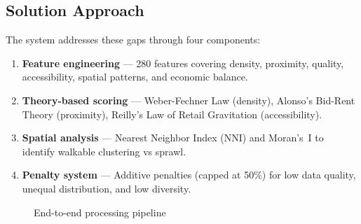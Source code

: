 \documentclass[11pt,a4paper]{article}
\begin{document}
\subsection{Solution Approach}

The system addresses these gaps through four components:

\begin{enumerate}
  \item \textbf{Feature engineering} --- 280 features covering density, proximity, quality, accessibility, spatial patterns, and economic balance.
  \item \textbf{Theory-based scoring} --- Weber-Fechner Law (density), Alonso's Bid-Rent Theory (proximity), Reilly's Law of Retail Gravitation (accessibility).
  \item \textbf{Spatial analysis} --- Nearest Neighbor Index (NNI) and Moran's~I to identify walkable clustering vs sprawl.
  \item \textbf{Penalty system} --- Additive penalties (capped at 50\%) for low data quality, unequal distribution, and low diversity.
\end{enumerate}

\begin{figure}[H]
\centering
{}
\caption{End-to-end processing pipeline}
\end{figure}
\end{document}
